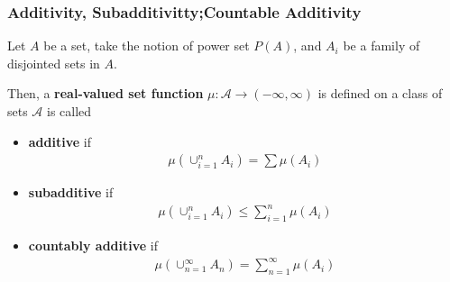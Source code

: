 \documentclass[Total.tex]{subfiles}
\begin{document}
			\subsubsection{Additivity, Subadditivitty;Countable Additivity}
			\begin{Def}Let $A$ be a set, take the notion of power set $P(A)$, and $A_i$ be a family of disjointed sets in $A$. 
				
				Then, a \textbf{real-valued set function} $\mu:\mathcal{A}\rightarrow (-\infty,\infty)$ is defined on a class of sets $\mathcal{A}$ is called
				\begin{itemize}
					\item 
					 \textbf{additive} if
					\begin{gather*}
						\mu(\cup_{i=1}^n A_i)=\sum \mu(A_i)
					\end{gather*}
					
					\item \textbf{subadditive} if
					\begin{gather*}
						\mu(\cup_{i=1}^n A_i)\leq \sum_{i=1}^n \mu(A_i)
					\end{gather*}
					
					\item \textbf{countably additive} if 
					\begin{gather*}
						\mu(\cup_{n=1}^\infty A_n)=\sum_{n=1}^\infty \mu(A_i)
					\end{gather*}
				\end{itemize} 
			\end{Def}
			
\end{document}
